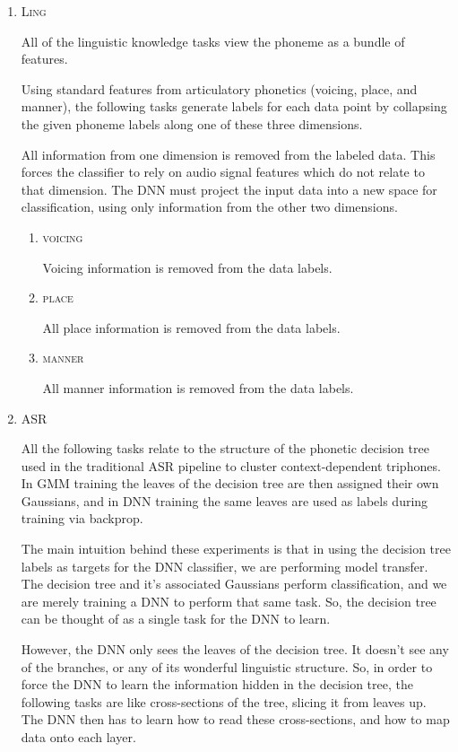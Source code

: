 \documentclass[10pt,a4paper]{article}
\begin{document}
\begin{enumerate}
\item \textsc{Ling}

  All of the linguistic knowledge tasks view the phoneme as a bundle of features.

  Using standard features from articulatory phonetics (voicing, place, and manner), the following tasks generate labels for each data point by collapsing the given phoneme labels along one of these three dimensions.

  All information from one dimension is removed from the labeled data. This forces the classifier to rely on audio signal features which do not relate to that dimension. The DNN must project the input data into a new space for classification, using only information from the other two dimensions. 

  
  \begin{enumerate}
  \item \textsc{voicing}

    Voicing information is removed from the data labels.

  \item \textsc{place}

    All place information is removed from the data labels.
    
  \item \textsc{manner}
    
    All manner information is removed from the data labels.
    
  \end{enumerate}
\item \textsc{ASR}

  All the following tasks relate to the structure of the phonetic decision tree used in the traditional ASR pipeline to cluster context-dependent triphones. In GMM training the leaves of the decision tree are then assigned their own Gaussians, and in DNN training the same leaves are used as labels during training via backprop.

  The main intuition behind these experiments is that in using the decision tree labels as targets for the DNN classifier, we are performing model transfer. The decision tree and it's associated Gaussians perform classification, and we are merely training a DNN to perform that same task. So, the decision tree can be thought of as a single task for the DNN to learn.

  However, the DNN only sees the leaves of the decision tree. It doesn't see any of the branches, or any of its wonderful linguistic structure. So, in order to force the DNN to learn the information hidden in the decision tree, the following tasks are like cross-sections of the tree, slicing it from leaves up. The DNN then has to learn how to read these cross-sections, and how to map data onto each layer.


\end{enumerate}
\end{document}
